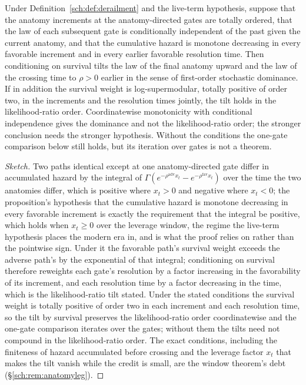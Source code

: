 \begin{proposition}\label{sch:prop:settlement}
Under Definition~\ref{sch:def:derailment} and the live-term
hypothesis, suppose that the anatomy increments at the anatomy-directed
gates are totally ordered, that the law of each subsequent gate is
conditionally independent of the past given the current anatomy, and
that the cumulative hazard is monotone decreasing in every favorable
increment and in every earlier favorable resolution time. Then
conditioning on survival tilts the law of the final anatomy upward and
the law of the crossing time to $\rho>0$ earlier in the sense of
first-order stochastic dominance. If in addition the survival weight
is log-supermodular, totally positive of order two, in the increments
and the resolution times jointly, the tilt holds in the
likelihood-ratio order. Coordinatewise monotonicity with conditional
independence gives the dominance and not the likelihood-ratio order;
the stronger conclusion needs the stronger hypothesis. Without the
conditions the one-gate comparison below still holds, but its
iteration over gates is not a theorem.
\end{proposition}

\begin{proof}[Sketch]
Two paths identical except at one anatomy-directed gate differ in
accumulated hazard by the integral of
$\Gamma(e^{-\rho^{\mathrm{adv}}x_t}-e^{-\rho^{\mathrm{fav}}x_t})$ over the
time the two anatomies differ, which is positive where $x_t>0$ and
negative where $x_t<0$; the proposition's hypothesis that the
cumulative hazard is monotone decreasing in every favorable increment
is exactly the requirement that the integral be positive, which holds
when $x_t\ge0$ over the leverage window, the regime the live-term
hypothesis places the modern era in, and is what the proof relies on
rather than the pointwise sign. Under it the favorable path's survival
weight exceeds the adverse path's by the exponential of that integral; conditioning on survival therefore reweights each gate's
resolution by a factor increasing in the favorability of its
increment, and each resolution time by a factor decreasing in the
time, which is the likelihood-ratio tilt stated. Under the stated conditions the survival weight is totally positive of
order two in each increment and each resolution time, so the tilt by
survival preserves the likelihood-ratio order coordinatewise and the
one-gate comparison iterates over the gates; without them the tilts need
not compound in the likelihood-ratio order. The exact conditions, including the
finiteness of hazard accumulated before crossing and the leverage
factor $x_t$ that makes the tilt vanish while the credit is small,
are the window theorem's debt (\S\ref{sch:rem:anatomyleg}).
\end{proof}


